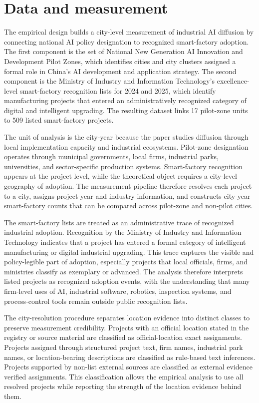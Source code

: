 \documentclass[12pt]{article}
\begin{document}
\section{Data and measurement}
\label{sec:data}

The empirical design builds a city-level measurement of industrial AI diffusion by connecting national AI policy designation to recognized smart-factory adoption. The first component is the set of National New Generation AI Innovation and Development Pilot Zones, which identifies cities and city clusters assigned a formal role in China's AI development and application strategy. The second component is the Ministry of Industry and Information Technology's excellence-level smart-factory recognition lists for 2024 and 2025, which identify manufacturing projects that entered an administratively recognized category of digital and intelligent upgrading. The resulting dataset links 17 pilot-zone units to 509 listed smart-factory projects.

The unit of analysis is the city-year because the paper studies diffusion through local implementation capacity and industrial ecosystems. Pilot-zone designation operates through municipal governments, local firms, industrial parks, universities, and sector-specific production systems. Smart-factory recognition appears at the project level, while the theoretical object requires a city-level geography of adoption. The measurement pipeline therefore resolves each project to a city, assigns project-year and industry information, and constructs city-year smart-factory counts that can be compared across pilot-zone and non-pilot cities.

The smart-factory lists are treated as an administrative trace of recognized industrial adoption. Recognition by the Ministry of Industry and Information Technology indicates that a project has entered a formal category of intelligent manufacturing or digital industrial upgrading. This trace captures the visible and policy-legible part of adoption, especially projects that local officials, firms, and ministries classify as exemplary or advanced. The analysis therefore interprets listed projects as recognized adoption events, with the understanding that many firm-level uses of AI, industrial software, robotics, inspection systems, and process-control tools remain outside public recognition lists.

The city-resolution procedure separates location evidence into distinct classes to preserve measurement credibility. Projects with an official location stated in the registry or source material are classified as official-location exact assignments. Projects assigned through structured project text, firm names, industrial park names, or location-bearing descriptions are classified as rule-based text inferences. Projects supported by non-list external sources are classified as external evidence verified assignments. This classification allows the empirical analysis to use all resolved projects while reporting the strength of the location evidence behind them.
\end{document}
